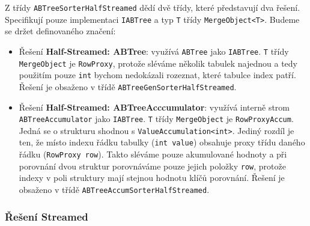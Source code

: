 Z třídy \texttt{ABTreeSorterHalfStreamed} dědí dvě třídy, které představují dva řešení.
Specifikují pouze implementaci \texttt{IABTree} a typ \texttt{T} třídy \texttt{MergeObject<T>}.
Budeme se držet definovaného značení:
\begin{itemize}
\item Řešení \textbf{Half-Streamed: ABTree}: využívá \texttt{ABTree} jako \texttt{IABTree}.
\texttt{T} třídy \texttt{MergeObject} je \texttt{RowProxy}, protože sléváme několik tabulek najednou a tedy použitím pouze \texttt{int} bychom nedokázali rozeznat, které tabulce index patří.
Řešení je obsaženo v třídě \texttt{ABTreeGenSorterHalfStreamed}.

\item Řešení \textbf{Half-Streamed: ABTreeAcccumulator}: využívá interně strom \texttt{ABTreeAccumulator} jako \texttt{IABTree}.
\texttt{T} třídy \texttt{MergeObject} je \texttt{RowProxyAccum}.
Jedná se o strukturu shodnou s \texttt{ValueAccumulation<int>}. 
Jediný rozdíl je ten, že místo indexu řádku tabulky (\texttt{int value}) obsahuje proxy třídu daného řádku (\texttt{RowProxy row}).
Takto sléváme pouze akumulované hodnoty a při porovnání dvou struktur porovnáváme pouze jejich položky \texttt{row}, protože indexy v poli struktury mají stejnou hodnotu klíčů porovnání.
Řešení je obsaženo v třídě \texttt{ABTreeAccumSorterHalfStreamed}.

\end{itemize}

\subsubsection{Řešení Streamed}

